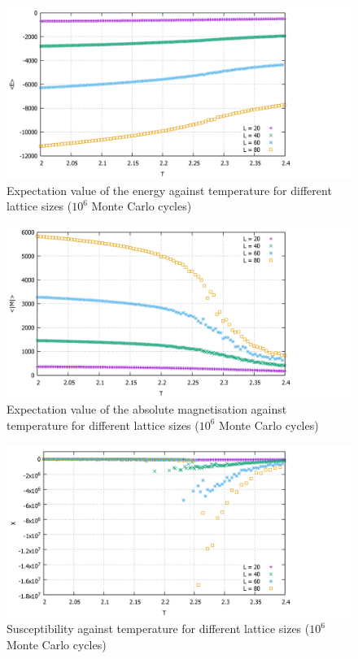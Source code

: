 \documentclass[10pt,a4paper]{article}
\begin{document}
\begin{figure}[h]
	\includegraphics[scale = 0.25]{E_all.png}
	\centering
	\caption{Expectation value of the energy against temperature for different lattice sizes ($10^6$ Monte Carlo cycles)}
	\label{e_all}
\end{figure}

\begin{figure}[h]
	\includegraphics[scale = 0.25]{absm_all.png}
	\centering
	\caption{Expectation value of the absolute magnetisation against temperature for different lattice sizes ($10^6$ Monte Carlo cycles)}
	\label{absm_all}
\end{figure}

\begin{figure}[h]
	\includegraphics[scale = 0.25]{sus_all.png}
	\centering
	\caption{Susceptibility against temperature for different lattice sizes ($10^6$ Monte Carlo cycles)}
	\label{chi_all}
\end{figure}
\end{document}
